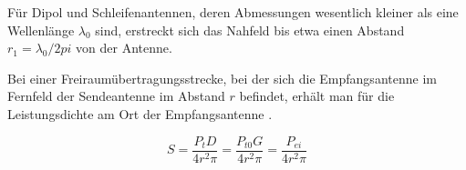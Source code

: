 Für Dipol und Schleifenantennen, deren Abmessungen wesentlich kleiner als eine Wellenlänge $\lambda_{0}$ sind, erstreckt sich das Nahfeld bis etwa einen Abstand   $r_{1}=\lambda_{0}/2pi$ von der Antenne.

Bei einer Freiraumübertragungsstrecke, bei der sich die Empfangsantenne im Fernfeld der Sendeantenne im Abstand $r$ befindet, erhält man für die Leistungsdichte am Ort der Empfangsantenne \cite{meinke1992taschenbuch}.

\begin{equation}
S=\dfrac{P_{t}D}{4r^{2}\pi} = \dfrac{P_{t0}G}{4r^{2}\pi}=\dfrac{P_{ei}}{4r^{2}\pi}\label{eq:LeistungsdichteS}
\end{equation}


%
%	
%	
%	
%	
%
%	
%
%
